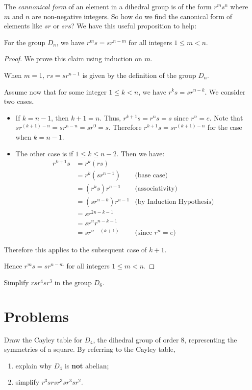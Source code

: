 The \textit{cannonical form} of an element in a dihedral group is of the form $r^ms^n$ where $m$ and $n$ are non-negative integers. So how do we find the canonical form of elements like $sr$ or $srs$? We have this useful proposition to help:
\begin{proposition}
    For the group $D_n$, we have $r^ms = sr^{n-m}$ for all integers $1 \leq m < n$.
\end{proposition}
\begin{proof}
    We prove this claim using induction on $m$.

    When $m = 1$, $rs = sr^{n-1}$ is given by the definition of the group $D_n$.

    Assume now that for some integer $1 \leq k < n$, we have $r^ks = sr^{n-k}$. We consider two cases.
    \begin{itemize}
        \item If $k = n - 1$, then $k + 1 = n$. Thus, $r^{k+1}s = r^ns = s$ since $r^n = e$. Note that $sr^{(k+1)-n} = sr^{n-n} = sr^0 = s$. Therefore $r^{k+1}s = sr^{(k+1)-n}$ for the case when $k = n - 1$.
        \item The other case is if $1 \leq k \leq n - 2$. Then we have:
        \begin{align*}
            r^{k+1}s &= r^k(rs)\\
            &= r^k(sr^{n-1}) & \text{(base case)}\\
            &= (r^ks)r^{n-1} & \text{(associativity)}\\
            &= (sr^{n-k})r^{n-1} & \text{(by Induction Hypothesis)}\\
            &= sr^{2n - k - 1}\\
            &= sr^nr^{n-k-1}\\
            &= sr^{n-(k+1)} & \text{(since } r^n = e \text{)}
        \end{align*}
    \end{itemize}
    Therefore this applies to the subsequent case of $k+1$.

    Hence $r^ms = sr^{n-m}$ for all integers $1 \leq m < n$.
\end{proof}

\begin{exercise}
    Simplify $rsr^4sr^3$ in the group $D_6$.
\end{exercise}

\newpage

\section{Problems}
\begin{problem}
    Draw the Cayley table for $D_4$, the dihedral group of order 8, representing the symmetries of a square. By referring to the Cayley table,
    \begin{enumerate}[label=(\alph*)]
        \item explain why $D_4$ is \textbf{not} abelian;
        \item simplify $r^3srsr^3sr^3sr^2$.
    \end{enumerate}
\end{problem}

